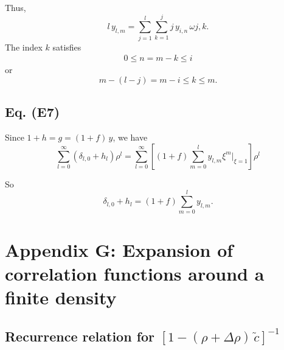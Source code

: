 \documentclass[preprint]{revtex4-1}
\numberwithin{equation}{subsection}
\numberwithin{table}{section}
\begin{document}
Thus,
\[
  l \, y_{l,m}
=
\sum_{j = 1}^{l} \sum_{k = 1}^j
j \, y_{i, n} \, \omega{j, k}.
\]
The index $k$ satisfies
\begin{align*}
   0 \le n = m - k \le i
\end{align*}
or
\[
  m - (l - j) = m - i \le k \le m.
\]


\subsection{Eq. (E7)}

Since $1+h = g = (1+f) \,y$, we have
\[
  \sum_{l = 0}^\infty (\delta_{l,0} + h_{l}) \rho^l
=
  \sum_{l = 0}^\infty
  \left[
    (1 + f) \sum_{m = 0}^l y_{l, m} \xi^m \Big|_{\xi = 1}
  \right] \rho^l
\]

So
\[
  \delta_{l, 0} + h_l
  = (1 + f) \sum_{m=0}^l
  y_{l, m}.
\]



\section{Appendix G: Expansion of correlation functions around a finite density}


\subsection{Recurrence relation for $[1 - (\rho + \Delta \rho) \, \tilde c]^{-1}$}
\end{document}
